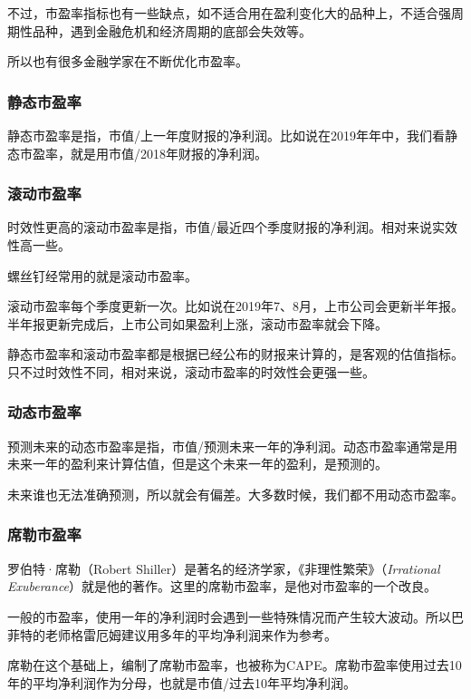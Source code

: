 不过，市盈率指标也有一些缺点，如不适合用在盈利变化大的品种上，不适合强周期性品种，遇到金融危机和经济周期的底部会失效等。

所以也有很多金融学家在不断优化市盈率。

\subsubsection{静态市盈率}

静态市盈率是指，市值/上一年度财报的净利润。比如说在2019年年中，我们看静态市盈率，就是用市值/2018年财报的净利润。

\subsubsection{滚动市盈率}

时效性更高的滚动市盈率是指，市值/最近四个季度财报的净利润。相对来说实效性高一些。

螺丝钉经常用的就是滚动市盈率。

滚动市盈率每个季度更新一次。比如说在2019年7、8月，上市公司会更新半年报。半年报更新完成后，上市公司如果盈利上涨，滚动市盈率就会下降。

静态市盈率和滚动市盈率都是根据已经公布的财报来计算的，是客观的估值指标。只不过时效性不同，相对来说，滚动市盈率的时效性会更强一些。

\subsubsection{动态市盈率}

预测未来的动态市盈率是指，市值/预测未来一年的净利润。动态市盈率通常是用未来一年的盈利来计算估值，但是这个未来一年的盈利，是预测的。

未来谁也无法准确预测，所以就会有偏差。大多数时候，我们都不用动态市盈率。

\subsubsection{席勒市盈率}

罗伯特·席勒（Robert Shiller）是著名的经济学家，《非理性繁荣》（\textit{Irrational Exuberance}）就是他的著作。这里的席勒市盈率，是他对市盈率的一个改良。

一般的市盈率，使用一年的净利润时会遇到一些特殊情况而产生较大波动。所以巴菲特的老师格雷厄姆建议用多年的平均净利润来作为参考。

席勒在这个基础上，编制了席勒市盈率，也被称为CAPE。席勒市盈率使用过去10年的平均净利润作为分母，也就是市值/过去10年平均净利润。

